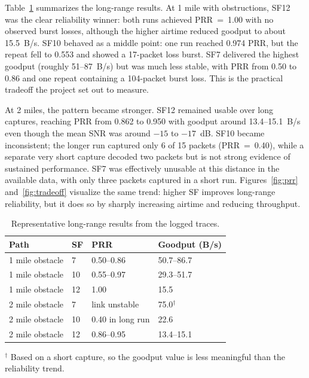 \documentclass[letterpaper,twocolumn,10pt]{article}
\begin{document}
Table~\ref{tab:longrange} summarizes the long-range results. At 1 mile with obstructions, SF12 was the clear reliability winner: both runs achieved PRR~=~1.00 with no observed burst losses, although the higher airtime reduced goodput to about 15.5~B/s. SF10 behaved as a middle point: one run reached 0.974 PRR, but the repeat fell to 0.553 and showed a 17-packet loss burst. SF7 delivered the highest goodput (roughly 51--87~B/s) but was much less stable, with PRR from 0.50 to 0.86 and one repeat containing a 104-packet burst loss. This is the practical tradeoff the project set out to measure.

At 2 miles, the pattern became stronger. SF12 remained usable over long captures, reaching PRR from 0.862 to 0.950 with goodput around 13.4--15.1~B/s even though the mean SNR was around $-15$ to $-17$~dB. SF10 became inconsistent; the longer run captured only 6 of 15 packets (PRR~=~0.40), while a separate very short capture decoded two packets but is not strong evidence of sustained performance. SF7 was effectively unusable at this distance in the available data, with only three packets captured in a short run. Figures~\ref{fig:prr} and~\ref{fig:tradeoff} visualize the same trend: higher SF improves long-range reliability, but it does so by sharply increasing airtime and reducing throughput.

\begin{table}[t]
\centering
\caption{Representative long-range results from the logged traces.}
\label{tab:longrange}
\begin{tabular}{llll}
\toprule
Path & SF & PRR & Goodput (B/s) \\
\midrule
1 mile obstacle & 7  & 0.50--0.86 & 50.7--86.7 \\
1 mile obstacle & 10 & 0.55--0.97 & 29.3--51.7 \\
1 mile obstacle & 12 & 1.00       & 15.5       \\
2 mile obstacle & 7  & link unstable & 75.0$^\dagger$ \\
2 mile obstacle & 10 & 0.40 in long run & 22.6 \\
2 mile obstacle & 12 & 0.86--0.95 & 13.4--15.1 \\
\bottomrule
\end{tabular}

\vspace{1mm}
\footnotesize{$^\dagger$ Based on a short capture, so the goodput value is less meaningful than the reliability trend.}
\end{table}
\end{document}

